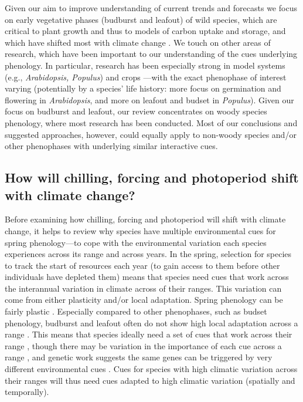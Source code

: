 \documentclass[11pt,letter]{article}
\begin{document}
Given our aim to improve understanding of current trends and forecasts we focus on early vegetative phases (budburst and leafout) of wild species, which are critical to plant growth and thus to models of carbon uptake and storage, and which have shifted most with climate change \citep{Cleland:2007or,IPCC:2014sm}. We touch on other areas of research, which have been important to our understanding of the cues underlying phenology. In particular, research has been especially strong in model systems (e.g., \emph{Arabidopsis, Populus}) and crops \citep{cesaraccio2004}---with the exact phenophase of interest varying (potentially by a species' life history: more focus on germination and flowering in \emph{Arabidopsis}, and more on leafout and budset in \emph{Populus}).  Given our focus on budburst and leafout, our review concentrates on woody species phenology, where most research has been conducted. Most of our conclusions and suggested approaches, however, could equally apply to non-woody species and/or other phenophases with underlying similar interactive cues.\\ 


\subsection{How will chilling, forcing and photoperiod shift with climate change?}
Before examining how chilling, forcing and photoperiod will shift with climate change, it helps to review why species have multiple environmental cues for spring phenology---to cope with the environmental variation each species experiences across its range and across years. In the spring, selection for species to track the start of resources each year (to gain access to them before other individuals have depleted them) means that species need cues that work across the interannual variation in climate across of their ranges. This variation can come from either plasticity and/or local adaptation. Spring phenology can be fairly plastic \citep{vitasselev,kramer2017}. Especially compared to other phenophases, such as budset phenology, budburst and leafout often do not show high local adaptation across a range \citep{mimura2010}. This means that species ideally need a set of cues that work across their range \citep{liepe2016}, though there may be variation in the importance of each cue across a range \citep[e.g., chilling can be higher in coastal versus continental, see also][]{}, and genetic work suggests the same genes can be triggered by very different environmental cues \citep[e.g., vernalization cues in \emph{Arabidopsis thaliana}][]{Stinchcombe:2004ec}. Cues for species with high climatic variation across their ranges will thus need cues adapted to high climatic variation (spatially and temporally).\\
\end{document}
